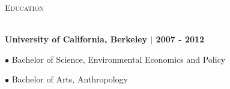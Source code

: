 \documentclass{article}
\newcommand{\lineunder}{\vspace*{-8pt} \\ \hspace*{-18pt} \hrulefill \\}
\newcommand{\header}[1]{{\hspace*{-15pt}\vspace*{6pt} \textsc{#1}} \vspace*{-6pt} \lineunder}
\begin{document}
\header{Education}
\begin{description}
 \item \textbf{University of California, Berkeley $|$ 2007 - 2012}
 \item$\bullet$ Bachelor of Science, Environmental Economics and Policy
 \item$\bullet$ Bachelor of Arts, Anthropology

 
\end{description}
\end{document}
